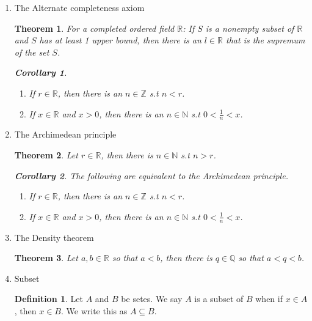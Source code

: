 \documentclass{article}
\theoremstyle{claim}
\newtheorem{theorem}{Theorem}[section]
\newtheorem{corollary}{Corollary}[theorem]
\theoremstyle{definition}
\newtheorem{definition}{Definition}
\begin{document}
\begin{enumerate}
    \item[23.] The Alternate completeness axiom
        \begin{theorem}
            For a completed ordered field $\mathbb{R}$: If $S$ is a nonempty subset of $\mathbb{R}$ and $S$ has at least 1 upper bound, then there is an $l \in \mathbb{R}$ that is the supremum of the set $S$.
            \begin{corollary}
                \begin{enumerate}
                    \item[1.] If $r \in \mathbb{R}$, then there is an $n \in \mathbb{Z}$ s.t $n < r$.
                    \item[2.] If $x \in \mathbb{R}$ and $x > 0$, then there is an $n \in \mathbb{N}$ s.t $0 < \frac{1}{n} < x$.
                \end{enumerate}
            \end{corollary}
        \end{theorem}

    \item[24.] The Archimedean principle
        \begin{theorem}
            Let $r \in \mathbb{R}$, then there is $n \in \mathbb{N}$ s.t $n > r$.
            \begin{corollary}
                The following are equivalent to the Archimedean principle.
                \begin{enumerate}
                    \item[1.] If $r \in \mathbb{R}$, then there is an $n \in \mathbb{Z}$ s.t $n < r$.
                    \item[2.] If $x \in \mathbb{R}$ and $x > 0$, then there is an $n \in \mathbb{N}$ s.t $0 < \frac{1}{n} < x$.
                \end{enumerate}
            \end{corollary}
        \end{theorem}
    
    \item[25.] The Density theorem
        \begin{theorem}
            Let $a, b \in \mathbb{R}$ so that $a < b$, then there is $q \in \mathbb{Q}$ so that $a < q < b$.
        \end{theorem}

    \item[26.] Subset
        \begin{definition}
            Let $A$ and $B$ be setes. We say $A$ is a subset of $B$ when if $x \in A$, then $x \in B$. We write this as $A \subseteq B$.
        \end{definition}


\end{enumerate}
\end{document}
